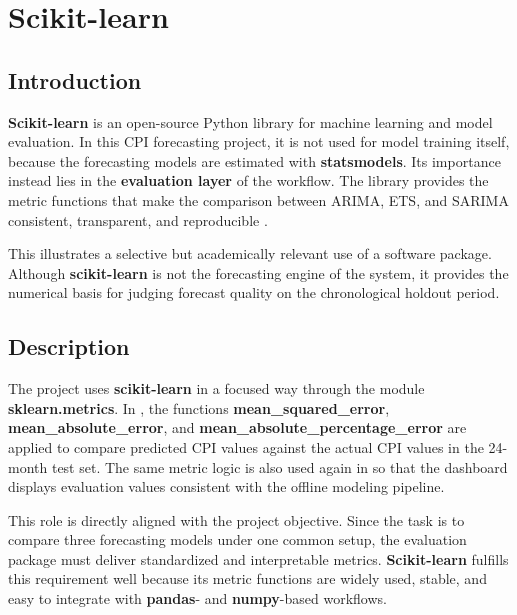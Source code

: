 %
%
%

\chapter{Scikit-learn}
\label{ch:scikit}

\section{Introduction}

\textbf{Scikit-learn} is an open-source Python library for machine learning and model evaluation. In this CPI forecasting project, it is not used for model training itself, because the forecasting models are estimated with \textbf{statsmodels}. Its importance instead lies in the \textbf{evaluation layer} of the workflow. The library provides the metric functions that make the comparison between ARIMA, ETS, and SARIMA consistent, transparent, and reproducible \cite{scikit-learn-doc}.

This illustrates a selective but academically relevant use of a software package. Although \textbf{scikit-learn} is not the forecasting engine of the system, it provides the numerical basis for judging forecast quality on the chronological holdout period.

\section{Description}

The project uses \textbf{scikit-learn} in a focused way through the module \textbf{sklearn.metrics}. In , the functions \textbf{mean\_squared\_error}, \textbf{mean\_absolute\_error}, and \textbf{mean\_absolute\_percentage\_error} are applied to compare predicted CPI values against the actual CPI values in the 24-month test set. The same metric logic is also used again in  so that the dashboard displays evaluation values consistent with the offline modeling pipeline.

This role is directly aligned with the project objective. Since the task is to compare three forecasting models under one common setup, the evaluation package must deliver standardized and interpretable metrics. \textbf{Scikit-learn} fulfills this requirement well because its metric functions are widely used, stable, and easy to integrate with \textbf{pandas}- and \textbf{numpy}-based workflows.

